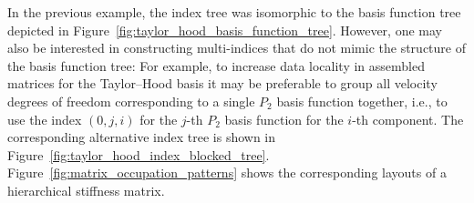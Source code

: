 \documentclass[a4paper,10pt,headings=normal,bibliography=totoc]{scrartcl}
\begin{document}
In the previous example, the index tree was
isomorphic to the basis function tree depicted in Figure~\ref{fig:taylor_hood_basis_function_tree}.
However, one may also be interested in constructing multi-indices
that do not mimic the structure of the basis function tree:
For example, to increase data locality in assembled matrices for the Taylor--Hood basis it may be
preferable to group all velocity degrees of freedom corresponding to a single
$P_2$ basis function together, i.e., to use the index $(0,j,i)$
for the $j$-th $P_2$ basis function for the $i$-th component.
The corresponding alternative index tree is shown in
Figure~\ref{fig:taylor_hood_index_blocked_tree}.
Figure~\ref{fig:matrix_occupation_patterns} shows the corresponding layouts of a hierarchical stiffness matrix.

\begin{figure}
 \begin{center}
\end{center}
\end{figure}
\end{document}
